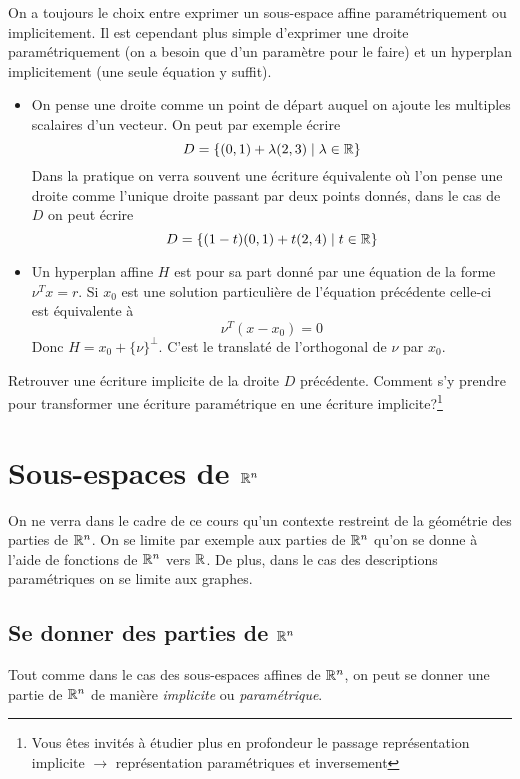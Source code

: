 \documentclass[11pt, a4paper]{article}
\begin{document}
On a toujours le choix entre exprimer un sous-espace affine
paramétriquement ou implicitement. Il est cependant plus simple
d'exprimer une droite paramétriquement (on a besoin que d'un paramètre
pour le faire) et un hyperplan implicitement (une seule équation y
suffit).
\begin{itemize}
\item On pense une droite comme un point de départ auquel on ajoute
  les multiples scalaires d'un vecteur. On peut par exemple écrire
\[
  D = \{(0,1) + \lambda(2, 3) \mid \lambda \in \mathbb{R}\}
\]
Dans la pratique on verra souvent une écriture équivalente où l'on
pense une droite comme l'unique droite passant par deux points
donnés, dans le cas de $D$ on peut écrire
\[
  D = \{(1-t)(0, 1) + t(2, 4) \mid t \in \mathbb{R}\}
\]
\item Un hyperplan affine $H$ est pour sa part donné par une équation
  de la forme $\nu^Tx = r$. Si $x_0$ est une solution particulière de
  l'équation précédente celle-ci est équivalente à
\[
  \nu^T(x - x_0) = 0
\]
Donc $H = x_0 + \{\nu\}^{\perp}$. C'est le translaté de l'orthogonal
de $\nu$ par $x_0$.
\end{itemize}
\begin{question}
  Retrouver une écriture implicite de la droite $D$
  précédente. Comment s'y prendre pour transformer une écriture
  paramétrique en une écriture implicite?\footnote{Vous êtes invités à
    étudier plus en profondeur le passage représentation implicite
    $\to$ représentation paramétriques et inversement}
\end{question}
\section{Sous-espaces de $\mathbb{R}^n$}

On ne verra dans le cadre de ce cours qu'un contexte restreint de la
géométrie des parties de $\mathbb{R}^n$. On se limite par exemple aux parties
de $\mathbb{R}^n$ qu'on se donne à l'aide de fonctions de $\mathbb{R}^n$ vers $\mathbb{R}$. De
plus, dans le cas des descriptions paramétriques on se limite aux
graphes.

\subsection{Se donner des parties de $\mathbb{R}^n$}

Tout comme dans le cas des sous-espaces affines de $\mathbb{R}^n$, on peut se
donner une partie de $\mathbb{R}^n$ de manière \emph{implicite} ou
\emph{paramétrique}.
\end{document}
